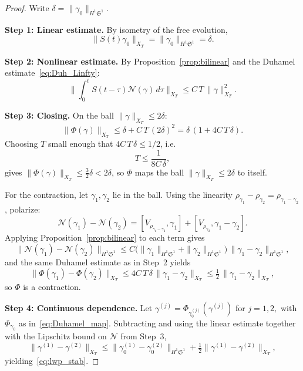 \documentclass[11pt]{amsart}
\theoremstyle{definition}
\newcommand{\Sp}{\mathfrak{S}}
\begin{document}
\begin{proof}
Write $\delta=\|\gamma_0\|_{H^1\Sp^1}$.

\medskip

\noindent\textbf{Step 1: Linear estimate.} By isometry of the free evolution,
\begin{equation}\label{eq:linear_XT}
  \|S(t)\gamma_0\|_{X_T}
  = \|\gamma_0\|_{H^1\Sp^1}
  = \delta.
\end{equation}

\medskip

\noindent\textbf{Step 2: Nonlinear estimate.} By Proposition~\ref{prop:bilinear} and the Duhamel estimate~\eqref{eq:Duh_Linfty}:
\begin{equation}\label{eq:Duh_S1}
  \biggl\|\int_0^t S(t-\tau)
  \mathcal{N}(\gamma)\,d\tau
  \biggr\|_{X_T}
  \le C\,T\,\|\gamma\|_{X_T}^2.
\end{equation}

\noindent\textbf{Step 3: Closing.} On the ball $\|\gamma\|_{X_T}\le 2\delta$:
\[
  \|\Phi(\gamma)\|_{X_T}
  \le \delta + C\,T\,(2\delta)^2
  = \delta\,(1 + 4C\,T\,\delta).
\]
Choosing $T$ small enough that $4C\,T\,\delta\le 1/2$, i.e.\
\begin{equation}\label{eq:delta_T}
  T \le \frac{1}{8C\,\delta},
\end{equation}
gives $\|\Phi(\gamma)\|_{X_T}\le\tfrac{3}{2}\delta<2\delta$, so $\Phi$ maps the ball $\|\gamma\|_{X_T}\le 2\delta$ to itself.

For the contraction, let $\gamma_1,\gamma_2$ lie in the ball. Using the linearity $\rho_{\gamma_1}-\rho_{\gamma_2}=\rho_{\gamma_1-\gamma_2}$, polarize:
\[
  \mathcal{N}(\gamma_1)-\mathcal{N}(\gamma_2)
  = [V_{\rho_{\gamma_1-\gamma_2}},\gamma_1]
  + [V_{\rho_{\gamma_2}},\gamma_1-\gamma_2].
\]
Applying Proposition~\ref{prop:bilinear} to each term gives
\[
  \|\mathcal{N}(\gamma_1)-\mathcal{N}(\gamma_2)\|_{H^1\Sp^1}
  \le C\bigl(\|\gamma_1\|_{H^1\Sp^1}+\|\gamma_2\|_{H^1\Sp^1}\bigr)
  \,\|\gamma_1-\gamma_2\|_{H^1\Sp^1},
\]
and the same Duhamel estimate as in Step~2 yields
\[
  \|\Phi(\gamma_1)-\Phi(\gamma_2)\|_{X_T}
  \le 4C\,T\,\delta\,
  \|\gamma_1-\gamma_2\|_{X_T}
  \le \tfrac{1}{2}\,
  \|\gamma_1-\gamma_2\|_{X_T},
\]
so $\Phi$ is a contraction.

\medskip

\noindent\textbf{Step 4: Continuous dependence.} Let $\gamma^{(j)}=\Phi_{\gamma_0^{(j)}}(\gamma^{(j)})$ for $j=1,2,$ with $\Phi_{\gamma_0}$ as in~\eqref{eq:Duhamel_map}. Subtracting and using the linear estimate together with the Lipschitz bound on $\mathcal{N}$ from Step~3,
\[
  \|\gamma^{(1)}-\gamma^{(2)}\|_{X_T}
  \le \|\gamma_0^{(1)}-\gamma_0^{(2)}\|_{H^1\Sp^1}
  + \tfrac12
    \|\gamma^{(1)}-\gamma^{(2)}\|_{X_T},
\]
yielding~\eqref{eq:lwp_stab}.
\end{proof}
\end{document}
